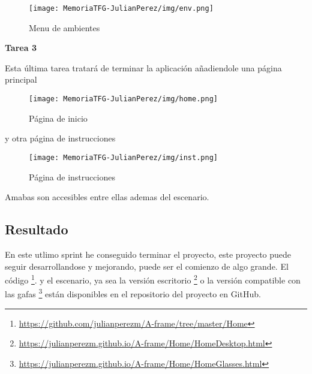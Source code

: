 \documentclass[a4paper, 12pt]{book}
\begin{document}
\begin{figure}[H]
  \centering
  \texttt{[image: MemoriaTFG-JulianPerez/img/env.png]}
  \caption{Menu de ambientes}\label{menu2}
\end{figure}

\textbf{Tarea 3}

Esta última tarea tratará de terminar la aplicación añadiendole una página principal

\begin{figure}[H]
  \centering
  \texttt{[image: MemoriaTFG-JulianPerez/img/home.png]}
  \caption{Página de inicio}\label{home}
\end{figure}

y otra página de instrucciones

\begin{figure}[H]
  \centering
  \texttt{[image: MemoriaTFG-JulianPerez/img/inst.png]}
  \caption{Página de instrucciones}\label{home}
\end{figure}

Amabas son accesibles entre ellas ademas del escenario.

\subsection{Resultado}

En este utlimo sprint he conseguido terminar el proyecto, este proyecto puede seguir desarrollandose y mejorando, puede ser el comienzo de algo grande. El código \footnote{\url{https://github.com/julianperezm/A-frame/tree/master/Home}}.  y el escenario, ya sea la versión escritorio \footnote{\url{https://julianperezm.github.io/A-frame/Home/HomeDesktop.html}} o la versión compatible con las gafas \footnote{\url{https://julianperezm.github.io/A-frame/Home/HomeGlasses.html}} están disponibles en el repositorio del proyecto en GitHub.
\end{document}

